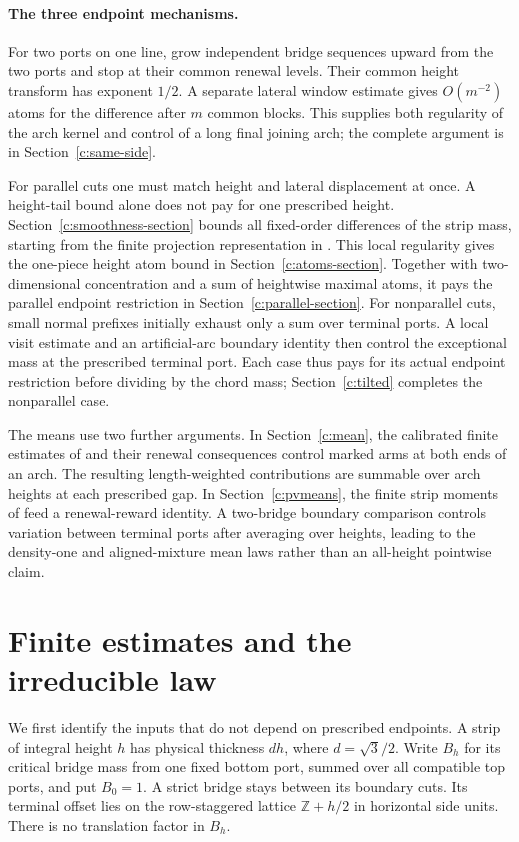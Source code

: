 \documentclass[11pt]{article}
\numberwithin{equation}{section}
\theoremstyle{definition}\newtheorem{definition}[theorem]{Definition}
\theoremstyle{remark}\newtheorem{remark}[theorem]{Remark}
\begin{document}
\paragraph{The three endpoint mechanisms.}
For two ports on one line, grow independent bridge sequences upward from
the two ports and stop at their common renewal levels. Their common
height transform has exponent $1/2$. A separate lateral window estimate
gives $O(m^{-2})$ atoms for the difference after $m$ common blocks. This supplies both regularity
of the arch kernel and control of a long final joining arch; the complete
argument is in Section~\ref{c:same-side}.

For parallel cuts one must match height and lateral displacement at once.
A height-tail bound alone does not pay for one prescribed height.
Section~\ref{c:smoothness-section} bounds all fixed-order differences of
the strip mass, starting from the finite projection representation in
\cite{UniformMarked}. This local regularity gives the one-piece height
atom bound in Section~\ref{c:atoms-section}. Together with two-dimensional
concentration and a sum of heightwise maximal atoms, it pays the parallel
endpoint restriction in Section~\ref{c:parallel-section}.
For nonparallel cuts, small normal prefixes
initially exhaust only a sum over terminal ports. A local visit estimate
and an artificial-arc boundary identity then control the exceptional
mass at the prescribed terminal port. Each case thus pays for its actual
endpoint restriction before dividing by the chord mass;
Section~\ref{c:tilted} completes the nonparallel case.

The means use two further arguments. In Section~\ref{c:mean}, the
calibrated finite estimates of \cite{Calibrated} and their renewal
consequences control marked arms at both ends of an arch. The resulting
length-weighted contributions are summable over arch heights at each
prescribed gap. In Section~\ref{c:pvmeans},
the finite strip moments of \cite{PolynomialVacuum} feed a renewal-reward
identity. A two-bridge boundary comparison controls variation between
terminal ports after averaging over heights, leading to the density-one
and aligned-mixture mean laws rather than an all-height pointwise claim.

\section{Finite estimates and the irreducible law}\label{c:inputs}
We first identify the inputs that do not depend on prescribed endpoints.
A strip of integral height $h$ has physical thickness $dh$, where
$d=\sqrt3/2$. Write $B_h$ for its critical bridge mass from one fixed
bottom port, summed over all compatible top ports, and put $B_0=1$.
A strict bridge stays between its boundary cuts. Its terminal offset lies
on the row-staggered lattice $\mathbb Z+h/2$ in horizontal side units.
There is no translation factor in $B_h$.
\end{document}
